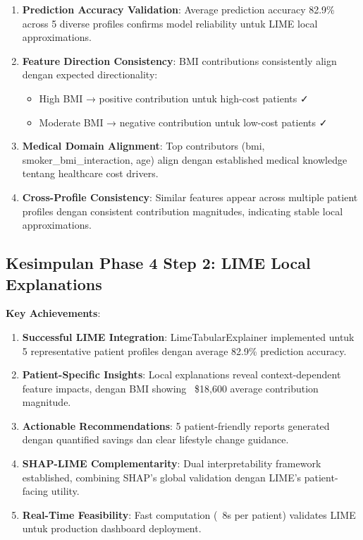\begin{enumerate}
    \item \textbf{Prediction Accuracy Validation}: Average prediction accuracy 82.9\% across 5 diverse profiles confirms model reliability untuk LIME local approximations.

    \item \textbf{Feature Direction Consistency}: BMI contributions consistently align dengan expected directionality:
    \begin{itemize}
        \item High BMI → positive contribution untuk high-cost patients ✓
        \item Moderate BMI → negative contribution untuk low-cost patients ✓
    \end{itemize}

    \item \textbf{Medical Domain Alignment}: Top contributors (bmi, smoker\_bmi\_interaction, age) align dengan established medical knowledge tentang healthcare cost drivers.

    \item \textbf{Cross-Profile Consistency}: Similar features appear across multiple patient profiles dengan consistent contribution magnitudes, indicating stable local approximations.
\end{enumerate}

\subsection{Kesimpulan Phase 4 Step 2: LIME Local Explanations}
\label{subsec:lime-conclusions}

\textbf{Key Achievements}:
\begin{enumerate}
    \item \textbf{Successful LIME Integration}: LimeTabularExplainer implemented untuk 5 representative patient profiles dengan average 82.9\% prediction accuracy.

    \item \textbf{Patient-Specific Insights}: Local explanations reveal context-dependent feature impacts, dengan BMI showing ~\$18,600 average contribution magnitude.

    \item \textbf{Actionable Recommendations}: 5 patient-friendly reports generated dengan quantified savings dan clear lifestyle change guidance.

    \item \textbf{SHAP-LIME Complementarity}: Dual interpretability framework established, combining SHAP's global validation dengan LIME's patient-facing utility.

    \item \textbf{Real-Time Feasibility}: Fast computation (~8s per patient) validates LIME untuk production dashboard deployment.
\end{enumerate}

